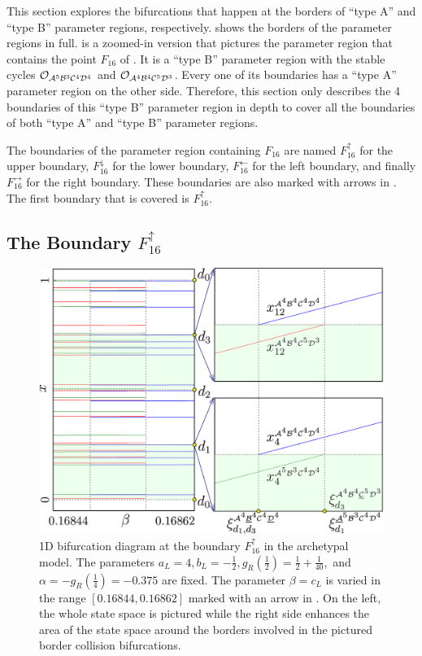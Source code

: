 This section explores the bifurcations that happen at the borders of ``type A'' and ``type B'' parameter regions, respectively.
 shows the borders of the parameter regions in full.
 is a zoomed-in version that pictures the parameter region that contains the point $F_{16}$ of .
It is a ``type B'' parameter region with the stable cycles $\mathcal{O}_{\mathcal{A}^5\mathcal{B}^3\mathcal{C}^4\mathcal{D}^4}$ and $\mathcal{O}_{\mathcal{A}^4\mathcal{B}^4\mathcal{C}^5\mathcal{D}^3}$.
Every one of its boundaries has a ``type A'' parameter region on the other side.
Therefore, this section only describes the 4 boundaries of this ``type B'' parameter region in depth to cover all the boundaries of both ``type A'' and ``type B'' parameter regions.

The boundaries of the parameter region containing $F_{16}$ are named $F_{16}^\uparrow$ for the upper boundary, $F_{16}^\downarrow$ for the lower boundary, $F_{16}^\leftarrow$ for the left boundary, and finally $F_{16}^\rightarrow$ for the right boundary.
These boundaries are also marked with arrows in .
The first boundary that is covered is $F_{16}^\uparrow$.

\subsection{The Boundary $F_{16}^\uparrow$}
\label{sec:arch.bif.U}

\begin{figure}
	\centering
	\includegraphics[width=.7 \textwidth]{../Figures/6/6.4/result.png}
	\caption[1D bifurcation diagram at the boundary $F_{16}^\uparrow$ in the archetypal model]{
		1D bifurcation diagram at the boundary $F_{16}^\uparrow$ in the archetypal model.
		The parameters $a_L = 4, b_L = -\frac{1}{2}, g_R\left(\frac{1}{2}\right) = \frac{1}{2} + \frac{1}{40},$ and $\alpha = -g_R\left(\frac{1}{4}\right) = -0.375$ are fixed.
		The parameter $\beta = c_L$ is varied in the range $[0.16844, 0.16862]$ marked with an arrow in .
		On the left, the whole state space is pictured while the right side enhances the area of the state space around the borders involved in the pictured border collision bifurcations.
	}
	\label{fig:arch.bif.F.up}
\end{figure}

